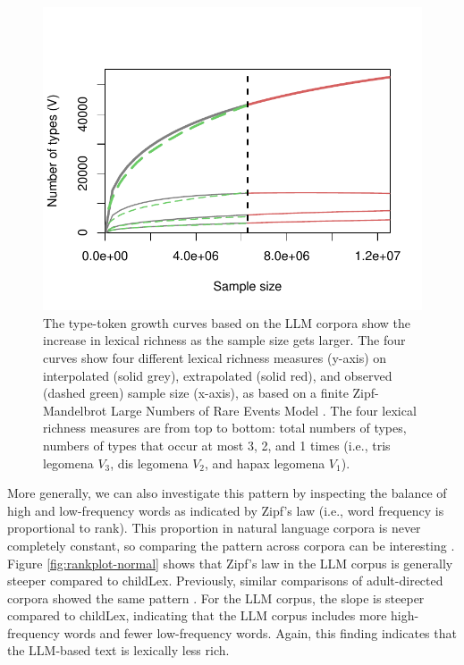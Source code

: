 \documentclass[manuscript]{stjour}
\begin{document}
\begin{figure}[!htbp]
  \centering
    \includegraphics[scale=.75]{figures/df.growth.intrextr-3.5.pdf}
    \caption{The type-token growth curves based on the LLM corpora show the increase in lexical richness as the sample size gets larger. The four curves show four different lexical richness measures (y-axis) on interpolated (solid grey), extrapolated (solid red), and observed (dashed green) sample size (x-axis), as based on a finite Zipf-Mandelbrot Large Numbers of Rare Events Model \citep[LNRE model, see][]{evert_simple_2004}. The four lexical richness measures are from top to bottom: total numbers of types, numbers of types that occur at most 3, 2, and 1 times (i.e., tris legomena $V_3$, dis legomena $V_2$, and hapax legomena $V_1$).}
    \label{fig:df.growth.intrextr}
  \hfill
\end{figure}

More generally, we can also investigate this pattern by inspecting the balance of high and low-frequency words as indicated by Zipf's law (i.e., word frequency is proportional to rank). This proportion in natural language corpora is never completely constant, so comparing the pattern across corpora can be interesting \citep[see, e.g., ][]{baayen_analyzing_2008, piantadosi_zipfs_2014, baayen_word_2001}. Figure \ref{fig:rankplot-normal} shows that Zipf's law in the LLM corpus is generally steeper compared to childLex. Previously, similar comparisons of adult-directed corpora showed the same pattern \citep[i.e., SUBTLEX and Google Book corpus, ][]{brysbaert_impact_2016}. For the LLM corpus, the slope is steeper compared to childLex, indicating that the LLM corpus includes more high-frequency words and fewer low-frequency words. Again, this finding indicates that the LLM-based text is lexically less rich.  
\end{document}

